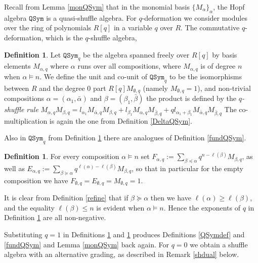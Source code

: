 \documentclass{article}
\theoremstyle{definition}
\newtheorem{defn}[thm]{Definition}
\begin{document}
Recall from Lemma \ref{monQSym} that in the monomial basis $\{M_{\alpha}\}_{\alpha}$, the Hopf algebra $\mathtt{QSym}$ is a quasi-shuffle algebra. For $q$-deformation we consider modules over the ring of polynomials $R[q]$ in a variable $q$ over $R$. The commutative $q$-deformation, which is the $q$-shuffle algebra,
\begin{defn}
Let $\mathtt{QSym}_{q}$ be the algebra spanned freely over $R[q]$ by basis elements $M_{\alpha,q}$ where $\alpha$ runs over all compositions, where $M_{\alpha,q}$ is of degree $n$ when $\alpha \vDash n$. We define the unit and co-unit of $\mathtt{QSym}_{q}$ to be the isomorphisms between $R$ and the degree 0 part $R[q]M_{\emptyset,q}$ (namely $M_{\emptyset,q}=1$), and non-trivial compositions $\alpha=(\alpha_{1},\bar{\alpha})$ and $\beta=(\beta_{1},\bar{\beta})$ the product is defined by the \emph{$q$-shuffle rule} $M_{\alpha,q}M_{\beta,q}=l_{\alpha_{1}}M_{\bar{\alpha},q}M_{\beta,q}+l_{\beta_{1}}M_{\alpha,q}M_{\bar{\beta},q}+ql_{\alpha_{1}+\beta_{1}}M_{\bar{\alpha},q}M_{\bar{\beta},q}$ The co-multiplication is again the one from Definition \ref{DeltaQSym}. \label{comqdef}
\end{defn}
Also in $\mathtt{QSym}_{q}$ from Definition \ref{comqdef} there are analogues of Definition \ref{fundQSym}.
\begin{defn}
For every composition $\alpha \vDash n$ set $F_{\alpha,q}:=\sum_{\beta\preceq\alpha}q^{n-\ell(\beta)}M_{\beta,q}$, as well as $E_{\alpha,q}:=\sum_{\beta\succeq\alpha}q^{\ell(\alpha)-\ell(\beta)}M_{\beta,q}$, so that in particular for the empty composition we have $F_{\emptyset,q}=E_{\emptyset,q}=M_{\emptyset,q}=1$. \label{fundqQSym}
\end{defn}
It is clear from Definition \ref{refine} that if $\beta\succeq\alpha$ then we have $\ell(\alpha)\geq\ell(\beta)$, and the equality $\ell(\beta) \leq n$ is evident when $\alpha \vDash n$. Hence the exponents of $q$ in Definition \ref{fundqQSym} are all non-negative.

Substituting $q=1$ in Definitions \ref{comqdef} and \ref{fundqQSym} produces Definitions \ref{QSymdef} and \ref{fundQSym} and Lemma \ref{monQSym} back again. For $q=0$ we obtain a shuffle algebra with an alternative grading, as described in Remark \ref{shdual} below.

\medskip
\end{document}
